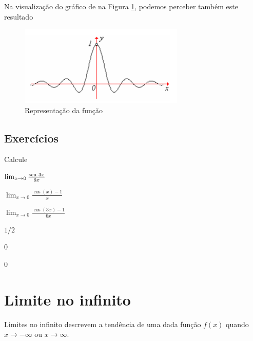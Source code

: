\cleardoublepage\documentclass[../main.tex]{subfiles}
\begin{document}
Na visualização do gráfico de  na Figura \ref{fig:lim_Senx/x}, podemos perceber também este resultado
\begin{figure}[H]
    \centering
     \includegraphics[width=0.7\textwidth]{fig_lim/FunSex_x}
  \caption{Representação da função }
  \label{fig:lim_Senx/x}
\end{figure}
\subsection{Exercícios}
\begin{exer}
  Calcule
  \begin{multicols}{3}
   \begin{compactenum}[a)]
    \item $ \lim_{x\to 0} \frac{\operatorname{sen}\, 3x}{6x}$\\
  \item $\lim_{x\to 0} \frac{\cos(x)-1}{x}$\\
  \item $\lim_{x\to 0} \frac{\cos(3x)-1}{6x}$
  \end{compactenum}
  \end{multicols}
  \end{exer}
  \begin{resp}
\begin{compactenum}[a)]
\item  $1/2$
\item  $0$
\item $0$
\end{compactenum}
\end{resp}

\section{Limite no infinito}\hypertarget{Lim_no_Inf}{}\label{sec:LimiteNInfinito}
Limites no infinito descrevem a tendência de uma dada função $f(x)$ quando $x\to -\infty$ ou $x\to\infty$.
\end{document}

